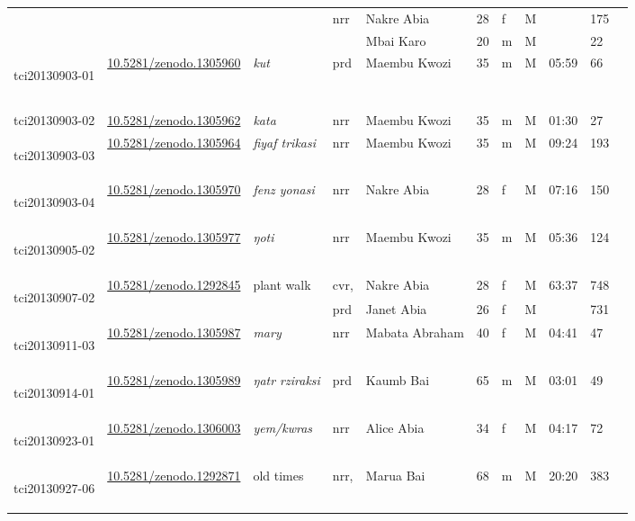 \begin{landscape}
{\begin{longtable}{p{}llllllllll}
	&&&\multirow{2}{*}{nrr}&Nakre Abia&28&f&M&&175\\
	&&&&Mbai Karo&20&m&M&&22\\\hline
	\hypertarget{tci20130903-01}{tci20130903-01} &\href{https://zenodo.org/record/1305960}{10.5281/zenodo.1305960}& \emph{kut} & prd & Maembu Kwozi & 35 & m & M & 05:59 & 66\\\hline
	& & & & & & & & & \\
	& & & & & & & & & \\
	tci20130903-02 &\href{https://zenodo.org/record/1305962}{10.5281/zenodo.1305962}& \emph{kata} & nrr & Maembu Kwozi & 35 & m & M & 01:30 & 27\\\hline
	\hypertarget{tci20130903-03}{tci20130903-03} &\href{https://zenodo.org/record/1305964}{10.5281/zenodo.1305964}& \emph{fiyaf trikasi} & nrr & Maembu Kwozi & 35 & m & M & 09:24 & 193\\\hline
	\hypertarget{tci20130903-04}{tci20130903-04} &\href{https://zenodo.org/record/1305970}{10.5281/zenodo.1305970}& \emph{fenz yonasi} & nrr & Nakre Abia & 28 & f & M & 07:16 & 150\\\hline
	\hypertarget{tci20130905-02}{tci20130905-02} &\href{https://zenodo.org/record/1305977}{10.5281/zenodo.1305977}& \emph{ŋoti} & nrr & Maembu Kwozi & 35 & m & M & 05:36 & 124\\\hline
	\multirow{2}{*}{\hypertarget{tci20130907-02}{tci20130907-02}} &\multirow{2}{*}{\href{https://zenodo.org/record/1292845}{10.5281/zenodo.1292845}}& \multirow{2}{*}{plant walk} & cvr, & Nakre Abia & 28 & f & M & \multirow{2}{*}{63:37} & 748\\
	&&&prd& Janet Abia &26&f&M&&731\\\hline
	\hypertarget{tci20130911-03}{tci20130911-03} &\href{https://zenodo.org/record/1305987}{10.5281/zenodo.1305987} &\emph{mary} & nrr & Mabata Abraham & 40 & f & M & 04:41 & 47\\\hline
	\hypertarget{tci20130914-01}{tci20130914-01} &\href{https://zenodo.org/record/1305989}{10.5281/zenodo.1305989}& \emph{ŋatr rziraksi} & prd & Kaumb Bai & 65 & m & M & 03:01 & 49\\\hline
	\hypertarget{tci20130923-01}{tci20130923-01} &\href{https://zenodo.org/record/1306003}{10.5281/zenodo.1306003}& \emph{yem/kwras} & nrr & Alice Abia & 34 & f & M & 04:17 & 72\\\hline
	\multirow{2}{*}{\hypertarget{tci20130927-06}{tci20130927-06}} &\multirow{2}{*}{\href{https://zenodo.org/record/1292871}{10.5281/zenodo.1292871}}& \multirow{2}{*}{old times} & nrr, & Marua Bai & 68 & m & M & \multirow{2}{*}{20:20} & 383\\

\end{longtable}}
\end{landscape}
